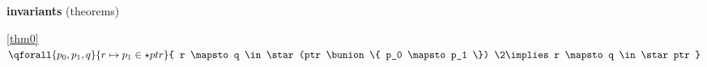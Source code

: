 \textbf{invariants} (theorems)
\begin{block}
\item[ \eqref{thm0} ]{$\qforall{p_0,p_1,q} %
			{ r \mapsto p_1 \in \star ptr } %
			{ r \mapsto q \in  %
				\star (ptr \bunion \{ p_0 \mapsto p_1 \})  %
			\2\implies r \mapsto q \in \star ptr } $} %
\end{block}
